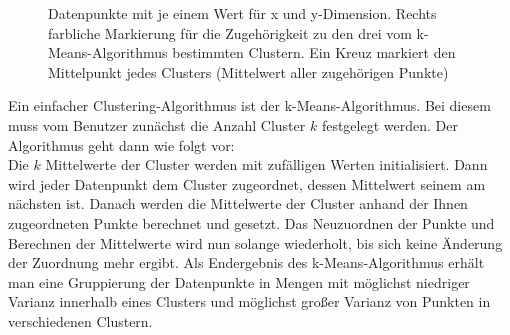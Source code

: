 \documentclass[
	12pt,
	a4paper,
	BCOR10mm,
	DIV14,
	listof=totoc,
	bibliography=totoc,
	headsepline
]{scrreprt}
\begin{document}
\begin{figure} [h]
	\hfill
	\caption{Datenpunkte mit je einem Wert für x und y-Dimension. Rechts farbliche Markierung für die Zugehörigkeit zu den drei vom k-Means-Algorithmus bestimmten Clustern. Ein Kreuz markiert den Mittelpunkt jedes Clusters (Mittelwert aller zugehörigen Punkte)}
	\label{fig:clustering_beispiel}
\end{figure} 

Ein einfacher Clustering-Algorithmus ist der k-Means-Algorithmus. Bei diesem muss vom Benutzer zunächst die Anzahl Cluster $k$ festgelegt werden. 
Der Algorithmus geht dann wie folgt vor:\\
Die $k$ Mittelwerte der Cluster werden mit zufälligen Werten initialisiert. Dann wird jeder Datenpunkt dem Cluster zugeordnet, dessen Mittelwert seinem am nächsten ist. Danach werden die Mittelwerte der Cluster anhand der Ihnen zugeordneten Punkte berechnet und gesetzt. Das Neuzuordnen der Punkte und Berechnen der Mittelwerte wird nun solange wiederholt, bis sich keine Änderung der Zuordnung mehr ergibt. Als Endergebnis des k-Means-Algorithmus erhält man eine Gruppierung der Datenpunkte in Mengen mit möglichst niedriger Varianz innerhalb eines Clusters und möglichst großer Varianz von Punkten in verschiedenen Clustern.
\end{document}
